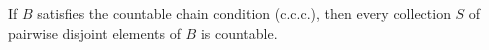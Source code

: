 If $B$ satisfies the countable chain condition (c.c.c.), then every collection $S$ of pairwise disjoint elements of $B$ is countable.
